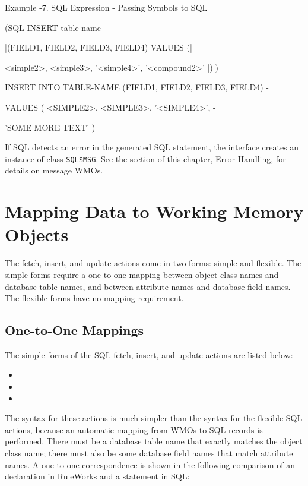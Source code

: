 Example -7. SQL Expression - Passing Symbols to SQL

        (SQL-INSERT table-name

        |(FIELD1, FIELD2, FIELD3, FIELD4) VALUES (|

        <simple2>, <simple3>, '<simple4>',
        '<compound2>' |)|)

        INSERT INTO TABLE-NAME (FIELD1, FIELD2,
        FIELD3, FIELD4) -

        VALUES ( <SIMPLE2>, <SIMPLE3>, '<SIMPLE4>',
        -

        'SOME MORE TEXT' )

        If SQL detects an error in the generated SQL statement, the
        interface creates an instance of class
        \verb|SQL$MSG|. See the section of this chapter, Error
        Handling, for details on message WMOs.

\section{Mapping Data to Working Memory Objects}

The fetch, insert, and update actions come in two forms: simple and
flexible. The simple forms require a one-to-one mapping between object
class names and database table names, and between attribute names and
database field names. The flexible forms have no mapping requirement.

\subsection{One-to-One Mappings}

The simple forms of the SQL fetch, insert, and update actions are
listed below:

\begin{itemize}
\item {}
\item {}
\item {}
\end{itemize}

The syntax for these actions is much simpler than the syntax for the
flexible SQL actions, because an automatic mapping from WMOs to SQL
records is performed. There must be a database table name that exactly
matches the object class name; there must also be some database field
names that match attribute names. A one-to-one correspondence is shown
in the following comparison of an  declaration in
RuleWorks and a  statement in SQL:

